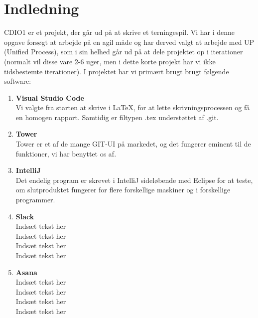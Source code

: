 \chapter{Indledning}
CDIO1 er et projekt, der går ud på at skrive et terningespil.
Vi har i denne opgave forsøgt at arbejde på en agil måde og har derved valgt at arbejde med UP (Unified Process), som i sin helhed går ud på at dele projektet op i iterationer (normalt vil disse vare 2-6 uger, men i dette korte projekt har vi ikke tidsbestemte iterationer).
I projektet har vi primært brugt brugt følgende software:
\begin{enumerate}
    \item \textbf{Visual Studio Code}
    \\ Vi valgte fra starten at skrive i LaTeX, for at lette skrivningsprocessen og få en homogen rapport.
    Samtidig er filtypen .tex understøttet af .git.
    \item \textbf{Tower}
    \\Tower er et af de mange GIT-UI på markedet, og det fungerer eminent til de funktioner, vi har benyttet os af.
    \item \textbf{IntelliJ}
    \\Det endelig program er skrevet i IntelliJ sideløbende med Eclipse for at teste, om slutproduktet fungerer for flere forskellige maskiner og i forskellige programmer.
    \item \textbf{Slack}
    \\Indsæt tekst her
    \\Indsæt tekst her
    \\Indsæt tekst her
    \\Indsæt tekst her
    \item \textbf{Asana}
    \\Indsæt tekst her
    \\Indsæt tekst her
    \\Indsæt tekst her
    \\Indsæt tekst her

\end{enumerate}